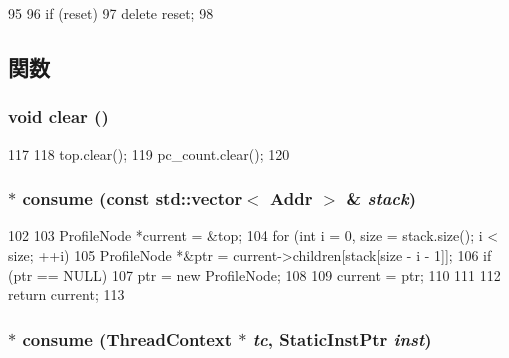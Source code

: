 \begin{DoxyCode}
95 {
96     if (reset)
97         delete reset;
98 }
\end{DoxyCode}


\subsection{関数}
\hypertarget{classFunctionProfile_ac8bb3912a3ce86b15842e79d0b421204}{
\subsubsection[{clear}]{\setlength{\rightskip}{0pt plus 5cm}void clear ()}}
\label{classFunctionProfile_ac8bb3912a3ce86b15842e79d0b421204}



\begin{DoxyCode}
117 {
118     top.clear();
119     pc_count.clear();
120 }
\end{DoxyCode}
\hypertarget{classFunctionProfile_a433766abe1b9e7377fe0e1be439b4794}{
\subsubsection[{consume}]{ $\ast$ consume (const {\bf std::vector}$<$ {\bf Addr} $>$ \& {\em stack})}}
\label{classFunctionProfile_a433766abe1b9e7377fe0e1be439b4794}



\begin{DoxyCode}
102 {
103     ProfileNode *current = &top;
104     for (int i = 0, size = stack.size(); i < size; ++i) {
105         ProfileNode *&ptr = current->children[stack[size - i - 1]];
106         if (ptr == NULL)
107             ptr = new ProfileNode;
108 
109         current = ptr;
110     }
111 
112     return current;
113 }
\end{DoxyCode}
\hypertarget{classFunctionProfile_a597d46ad07c398ed586cf6ac26a2249c}{
\subsubsection[{consume}]{ $\ast$ consume ({\bf ThreadContext} $\ast$ {\em tc}, \/  {\bf StaticInstPtr} {\em inst})}}
\label{classFunctionProfile_a597d46ad07c398ed586cf6ac26a2249c}



